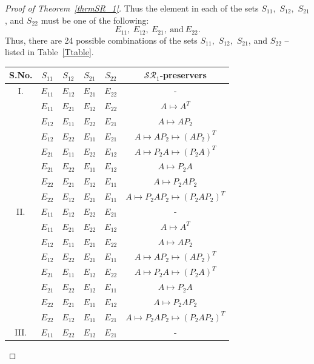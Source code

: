 \documentclass[11pt,reqno]{amsart}
\theoremstyle{plain}
\theoremstyle{definition}
\numberwithin{equation}{section}
\begin{document}
\begin{proof}[Proof of Theorem~\ref{thrmSR_1}]
	Thus the element in each of the sets $S_{11},$ $S_{12},$ $S_{21}$, and $S_{22}$ must be one of the following:
	\[E_{11},~E_{12},~E_{21},~\text{and}~ E_{22}.\]
	Thus, there are 24 possible combinations of the sets $S_{11},$ $S_{12},$ $S_{21}$, and $S_{22}$ -- listed in Table~\ref{Ttable}.
	\begin{table}[H]
		\begin{tabular}{ ||c|c|c|c|c|c||} 
			\hline\hline
			S.No. & $S_{11}$ & $S_{12}$ & $S_{21}$ & $S_{22}$ & $\mathcal{SR}_1$-preservers \\ 
			\hline\hline
			I. & $E_{11}$  &  $E_{12}$  &  $E_{21}$  &  $E_{22}$  & - \\
			& $E_{11}$  &  $E_{21}$  &  $E_{12}$  &  $E_{22}$  & $A\mapsto A^T$ \\
			& $E_{12}$  &  $E_{11}$  &  $E_{22}$  &  $E_{21}$  & $A\mapsto AP_2$  \\
			& $E_{12}$  &  $E_{22}$  &  $E_{11}$  &  $E_{21}$  & $A\mapsto AP_2\mapsto (AP_2)^T$ \\
			& $E_{21}$  &  $E_{11}$  &  $E_{22}$  &  $E_{12}$  & $A\mapsto P_2A\mapsto (P_2A)^T$ \\
			& $E_{21}$  &  $E_{22}$  &  $E_{11}$  &  $E_{12}$  & $A\mapsto P_2A$ \\
			& $E_{22}$  &  $E_{21}$  &  $E_{12}$  &  $E_{11}$  & $A\mapsto P_2AP_2$ \\
			& $E_{22}$  &  $E_{12}$  &  $E_{21}$  &  $E_{11}$  & $A\mapsto P_2AP_2\mapsto (P_2AP_2)^T$ \\
			\hline 
			II. & $E_{11}$  &  $E_{12}$  &  $E_{22}$  &  $E_{21}$  & - \\
			& $E_{11}$  &  $E_{21}$  &  $E_{22}$  &  $E_{12}$  & $A\mapsto A^T$ \\
			& $E_{12}$  &  $E_{11}$  &  $E_{21}$  &  $E_{22}$  & $A\mapsto AP_2$ \\
			& $E_{12}$  &  $E_{22}$  &  $E_{21}$  &  $E_{11}$  & $A\mapsto AP_2\mapsto (AP_2)^T$ \\
			& $E_{21}$  &  $E_{11}$  &  $E_{12}$  &  $E_{22}$  & $A\mapsto P_2A\mapsto (P_2A)^T$ \\
			& $E_{21}$  &  $E_{22}$  &  $E_{12}$  &  $E_{11}$  & $A\mapsto P_2A$ \\
			& $E_{22}$  &  $E_{21}$  &  $E_{11}$  &  $E_{12}$  & $A\mapsto P_2AP_2$  \\
			& $E_{22}$  &  $E_{12}$  &  $E_{11}$  &  $E_{21}$  & $A\mapsto P_2AP_2\mapsto (P_2AP_2)^T$  \\
			\hline
			III. & $E_{11}$  &  $E_{22}$  &  $E_{12}$  &  $E_{21}$  & - \\

\end{tabular}
\end{table}
\end{proof}
\end{document}
